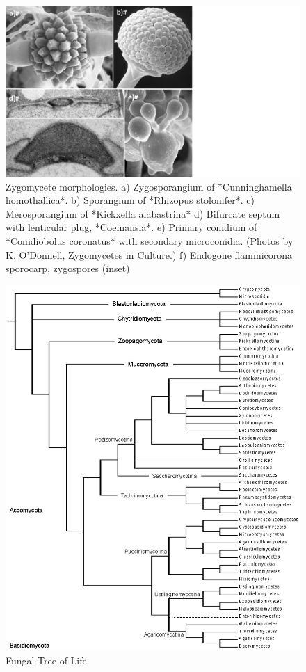 \documentclass[]{book}
\begin{document}
\begin{figure}

{\centering \includegraphics[width=17.49in]{img/Ch1_Fig1} 

}

\caption{Zygomycete morphologies. a) Zygosporangium of *Cunninghamella homothallica*. b) Sporangium of *Rhizopus stolonifer*. c) Merosporangium of *Kickxella alabastrina* d) Bifurcate septum with lenticular plug, *Coemansia*. e) Primary conidium of *Conidiobolus coronatus* with secondary microconidia. (Photos by K. O’Donnell, Zygomycetes in Culture.) f) Endogone flammicorona sporocarp, zygospores (inset)}\label{fig:ch1fig1}
\end{figure}

\begin{figure}

{\centering \includegraphics[width=11.97in]{img/Ch1_Fig2} 

}

\caption{Fungal Tree of Life}\label{fig:ch1fig2}
\end{figure}
\end{document}
